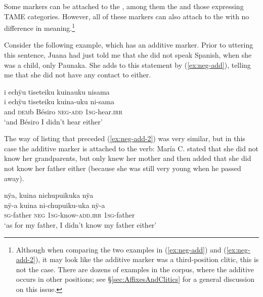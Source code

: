 Some markers can be attached to the , among them the  and those expressing TAME categories. However, all of these markers can also attach to the  with no difference in meaning.\footnote{Although when comparing the two examples in (\ref{ex:neg-add}) and (\ref{ex:neg-add-2}), it may look like the additive marker was a third-position clitic, this is not the case. There are dozens of examples in the corpus, where the additive occurs in other positions; see §\ref{sec:AffixesAndClitics} for a general discussion on this issue.}

Consider the following example, which has an additive marker. Prior to uttering this sentence, Juana had just told me that she did not speak Spanish, when she was a child, only Paunaka. She adds to this statement by (\ref{ex:neg-add}), telling me that she did not have any contact to  either. 


\ea\label{ex:neg-add}
\begingl
\glpreamble i echÿu tiseteiku kuinauku nisama\\
\gla i echÿu tiseteiku kuina-uku ni-sama\\
\glb and \textsc{dem}b Bésiro \textsc{neg}-\textsc{add} 1\textsc{sg}-hear.\textsc{irr}\\
\glft ‘and Bésiro I didn’t hear either’
\endgl
\trailingcitation{[jxx-p120430l-1.028-030]}
\xe

The way of listing that preceded (\ref{ex:neg-add-2}) was very similar, but in this case the additive marker is attached to the verb: María C. stated that she did not know her grandparents, but only knew her mother and then added that she did not know her father either (because she was still very young when he passed away).

\ea\label{ex:neg-add-2}
\begingl
\glpreamble nÿa, kuina nichupuikuka nÿa\\
\gla  nÿ-a kuina ni-chupuiku-uka nÿ-a\\
\textsc{sg}-father \textsc{neg} 1\textsc{sg}-know-\textsc{add.irr} 1\textsc{sg}-father\\
\glft ‘as for my father, I didn’t know my father either’
\endgl
\trailingcitation{[ump-p110815sf.148]}
\xe


